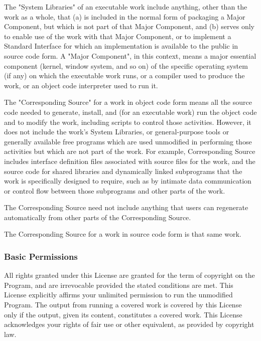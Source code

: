 \documentclass{ctexart}
\begin{document}
  The "System Libraries" of an executable work include anything, other
than the work as a whole, that (a) is included in the normal form of
packaging a Major Component, but which is not part of that Major
Component, and (b) serves only to enable use of the work with that
Major Component, or to implement a Standard Interface for which an
implementation is available to the public in source code form.  A
"Major Component", in this context, means a major essential component
(kernel, window system, and so on) of the specific operating system
(if any) on which the executable work runs, or a compiler used to
produce the work, or an object code interpreter used to run it.

  The "Corresponding Source" for a work in object code form means all
the source code needed to generate, install, and (for an executable
work) run the object code and to modify the work, including scripts to
control those activities.  However, it does not include the work's
System Libraries, or general-purpose tools or generally available free
programs which are used unmodified in performing those activities but
which are not part of the work.  For example, Corresponding Source
includes interface definition files associated with source files for
the work, and the source code for shared libraries and dynamically
linked subprograms that the work is specifically designed to require,
such as by intimate data communication or control flow between those
subprograms and other parts of the work.

  The Corresponding Source need not include anything that users
can regenerate automatically from other parts of the Corresponding
Source.

  The Corresponding Source for a work in source code form is that
same work.

\subsubsection{Basic Permissions}

  All rights granted under this License are granted for the term of
copyright on the Program, and are irrevocable provided the stated
conditions are met.  This License explicitly affirms your unlimited
permission to run the unmodified Program.  The output from running a
covered work is covered by this License only if the output, given its
content, constitutes a covered work.  This License acknowledges your
rights of fair use or other equivalent, as provided by copyright law.
\end{document}

